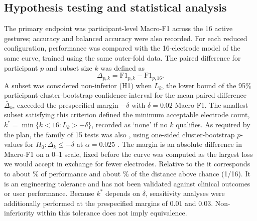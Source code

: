 \subsection[Hypothesis testing and statistical analysis]{Hypothesis testing and statistical analysis}
\label{sec:statistics}

The primary endpoint was participant-level Macro-F1 across the 16 active gestures; accuracy and balanced accuracy were also recorded. For each reduced configuration, performance was compared with the 16-electrode model of the same curve, trained using the same outer-fold data. The paired difference for participant $p$ and subset size $k$ was defined as
\begin{equation}
\Delta_{p,k} = \mathrm{F1}_{p,k} - \mathrm{F1}_{p,16}.
\end{equation}
A subset was considered non-inferior (H1) when $L_k$, the lower bound of the 95\% participant-cluster-bootstrap confidence interval for the mean paired difference $\bar\Delta_k$, exceeded the prespecified margin $-\delta$ with $\delta = 0.02$ Macro-F1. The smallest subset satisfying this criterion defined the minimum acceptable electrode count, $k^* = \min\{k < 16 : L_k > -\delta\}$, recorded as `none' if no $k$ qualifies. As required by the plan, the family of 15 tests was also , using one-sided cluster-bootstrap $p$-values for $H_0\colon \bar\Delta_k \le -\delta$ at $\alpha = 0.025$ . The margin is an absolute difference in Macro-F1 on a 0--1 scale, fixed before the curve was computed as the largest loss we would accept in exchange for fewer electrodes. Relative to the  it corresponds to about \MarginPctOfRef\% of performance and about \MarginPctAboveChance\% of the distance above chance (1/16). It is an engineering tolerance and has not been validated against clinical outcomes or user performance. Because $k^*$ depends on $\delta$, sensitivity analyses were additionally performed at the prespecified margins of 0.01 and 0.03. Non-inferiority within this tolerance does not imply equivalence.

